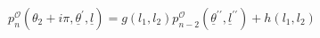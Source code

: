 \begin{equation}
p_{n}^{\mathcal{O}}(\theta_{2}+i\pi,\underline{\theta}^{\prime},\underline
{l})=g(l_{1},l_{2})p_{n-2}^{\mathcal{O}}(\underline{\theta}^{\prime\prime
},\underline{l}^{\prime\prime})+h(l_{1},l_{2})\label{pp3}%
\end{equation}

